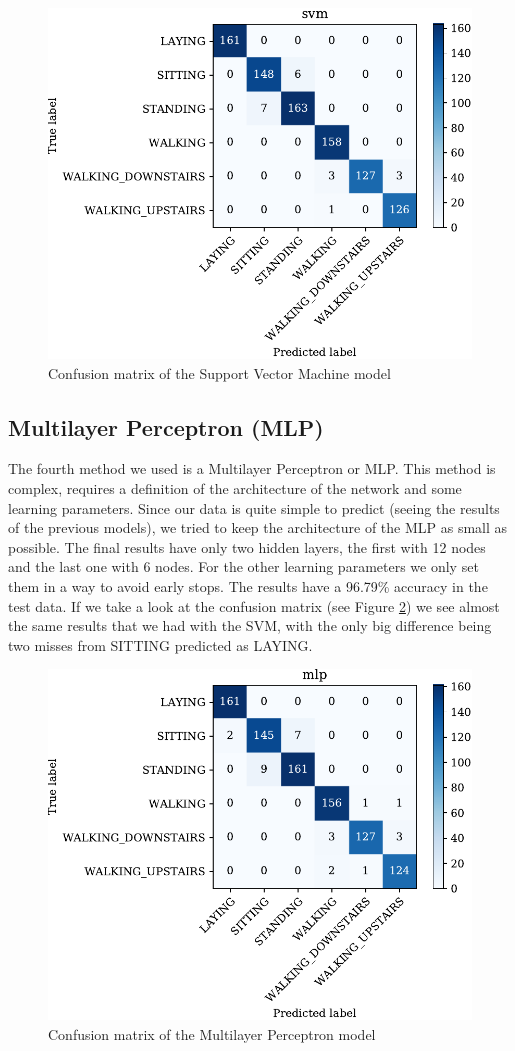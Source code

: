 \documentclass[conference,a4paper]{IEEEtran}
\begin{document}
\begin{figure}[htbp]
    \centering
    \includegraphics[width=0.8\columnwidth]{../plots/cm_svm.pdf}
    \caption{Confusion matrix of the Support Vector Machine model}
    \label{fig:cm_svm}
\end{figure}

\subsection{Multilayer Perceptron (MLP)}
The fourth method we used is a Multilayer Perceptron or MLP. This method is complex, requires a definition of the architecture of the network and some learning parameters. Since our data is quite simple to predict (seeing the results of the previous models), we tried to keep the architecture of the MLP as small as possible. The final results have only two hidden layers, the first with 12 nodes and the last one with 6 nodes. For the other learning parameters we only set them in a way to avoid early stops. The results have a 96.79\% accuracy in the test data. If we take a look at the confusion matrix (see Figure \ref{fig:cm_mlp}) we see almost the same results that we had with the SVM, with the only big difference being two misses from SITTING predicted as LAYING.

\begin{figure}[htbp]
    \centering
    \includegraphics[width=0.8\columnwidth]{../plots/cm_mlp.pdf}
    \caption{Confusion matrix of the Multilayer Perceptron model}
    \label{fig:cm_mlp}
\end{figure}
\end{document}
